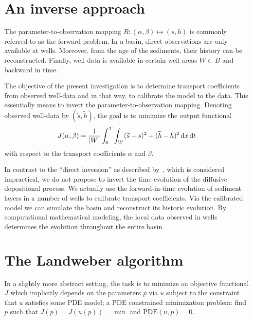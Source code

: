 \section{An inverse approach}

The parameter-to-observation mapping $R: (\alpha, \beta) \mapsto (s,
h)$ is commonly referred to as the forward problem.  In a basin, direct
observations are only available at wells. Moreover, from the age of
the sediments, their history can be reconstructed.  Finally, well-data
is available in certain well areas $W \subset B$ and backward in time.

The objective of the present investigation is to determine transport
coefficients from observed well-data and in that way, to calibrate the
model to the data. This essentially means to invert the
parameter-to-observation mapping. Denoting observed well-data by
$(\widetilde s,\widetilde h)$, the goal is to minimize the output
functional
\begin{equation} \label{eq:schroll:output}
 J(\alpha, \beta) =
 \frac{1}{|W|} \int_0^T \int_W (\widetilde s - s)^2 + (\widetilde h - h)^2  \, \mathrm{d}x \, \mathrm{d}t
\end{equation}
with respect to the transport coefficients $\alpha$ and $\beta$.

In contrast to the ``direct inversion'' as described
by~\citet{ImhofSharma2007}, which is considered impractical, we do not
propose to invert the time evolution of the diffusive depositional
process.  We actually use the forward-in-time evolution of sediment
layers in a number of wells to calibrate transport coefficients.  Via
the calibrated model we can simulate the basin and reconstruct its
historic evolution. By computational mathematical modeling, the local
data observed in wells determines the evolution throughout the entire
basin.

\section{The Landweber algorithm}

In a slightly more abstract setting, the task is to minimize an
objective functional $J$ which implicitly depends on the parameters
$p$ via $u$ subject to the constraint that $u$ satisfies some PDE
model; a PDE constrained minimization problem: find $p$ such that
$J(p)=J(u(p))=\min$ and $\mathrm{PDE}(u,p)=0$.

